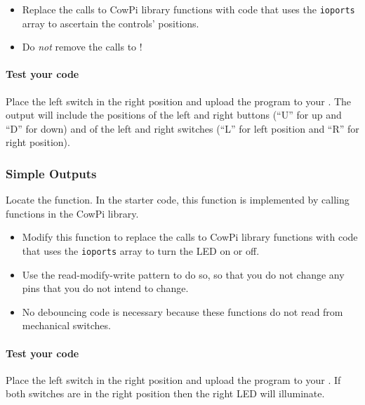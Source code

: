 \begin{itemize}
    \item Replace the calls to CowPi library functions with code that uses the \lstinline{ioports} array to ascertain the controls' positions.
    \item Do \textit{not} remove the calls to !
\end{itemize}

\paragraph{Test your code}

Place the left switch in the right position and upload the program to your \developmentboard.
The output will include the positions of the left and right buttons (``U'' for up and ``D'' for down) and of the left and right switches (``L'' for left position and ``R'' for right position).


\subsubsection{Simple Outputs}

Locate the  function.
In the starter code, this function is implemented by calling functions in the CowPi library.

\begin{itemize}
    \item Modify this function to replace the calls to CowPi library functions with code that uses the \lstinline{ioports} array to turn the LED on or off.
    \item Use the read-modify-write pattern to do so, so that you do not change any pins that you do not intend to change.
    \item No debouncing code is necessary because these functions do not read from mechanical switches.
\end{itemize}

\paragraph{Test your code}

Place the left switch in the right position and upload the program to your \developmentboard.
If both switches are in the right position then the right LED will illuminate.

\vspace{1cm}

